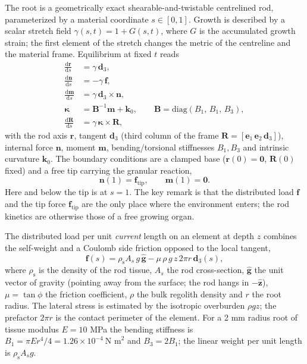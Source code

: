 \documentclass[preprint,12pt]{elsarticle}
\begin{document}
The root is a geometrically exact shearable-and-twistable centrelined rod,
parameterized by a material coordinate $s\in[0,1]$. Growth is described by a
scalar stretch field $\gamma(s,t)=1+G(s,t)$, where $G$ is the accumulated
growth strain; the first element of the stretch changes the metric of the
centreline and the material frame. Equilibrium at fixed $t$ reads
\begin{align}
  \frac{\mathrm{d}\mathbf r}{\mathrm{d}s} &= \gamma\,\mathbf d_3,
  \label{eq:kinematics}\\
  \frac{\mathrm{d}\mathbf n}{\mathrm{d}s} &= -\gamma\,\mathbf f,
  \label{eq:force}\\
  \frac{\mathrm{d}\mathbf m}{\mathrm{d}s} &= \gamma\,\mathbf d_3\times \mathbf n,
  \label{eq:moment}\\
  \boldsymbol\kappa &= \mathbf B^{-1}\mathbf m + \mathbf k_0,
  \qquad \mathbf B=\mathrm{diag}(B_1,\,B_1,\,B_3),
  \label{eq:constitutive}\\
  \frac{\mathrm{d}\mathbf R}{\mathrm{d}s} &= \gamma\,\boldsymbol\kappa\times\mathbf R ,
  \label{eq:frame}
\end{align}
with the rod axis $\mathbf r$, tangent $\mathbf d_3$ (third column of the
frame $\mathbf R=[\mathbf e_1\,\mathbf e_2\,\mathbf d_3]$), internal force
$\mathbf n$, moment $\mathbf m$, bending/torsional stiffnesses $B_1,B_3$ and
intrinsic curvature $\mathbf k_0$. The boundary conditions are a clamped base
($\mathbf r(0)=\mathbf 0$, $\mathbf R(0)$ fixed) and a free tip carrying the
granular reaction,
\begin{equation}
  \mathbf n(1)=\mathbf f_{\mathrm{tip}},\qquad \mathbf m(1)=\mathbf 0 .
  \label{eq:bc}
\end{equation}
Here and below the tip is at $s=1$. The key remark is that the distributed
load $\mathbf f$ and the tip force $\mathbf f_{\mathrm{tip}}$ are the only
place where the environment enters; the rod kinetics are otherwise those of a
free growing organ.

The distributed load per unit \emph{current} length on an element at depth
$z$ combines the self-weight and a Coulomb side friction opposed to the local
tangent,
\begin{equation}
  \mathbf f(s) = \rho_{\mathrm{s}} A_s\, g\,\hat{\mathbf g} -
  \mu\,\rho\,g\,z\, 2\pi r\,\mathbf d_3(s),
  \label{eq:distributed}
\end{equation}
where $\rho_{\mathrm{s}}$ is the density of the rod tissue, $A_s$ the rod
cross-section, $\hat{\mathbf g}$ the unit vector of gravity (pointing away
from the surface; the rod hangs in $-\hat{\mathbf z}$), $\mu=\tan\phi$ the
friction coefficient, $\rho$ the bulk regolith density and $r$ the root
radius. The lateral stress is estimated by the isotropic overburden $\rho g
z$; the prefactor $2\pi r$ is the contact perimeter of the element. For a 2
mm radius root of tissue modulus $E=10$ MPa the bending stiffness is
$B_1=\pi E r^4/4 = 1.26\times10^{-4}\ \text{N m}^2$ and $B_3=2B_1$; the
linear weight per unit length is $\rho_{\mathrm{s}} A_s g$.
\end{document}
